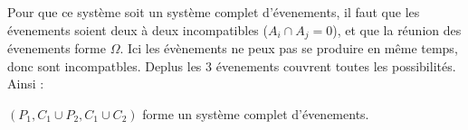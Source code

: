 Pour que ce système soit un système complet d'évenements, il faut que les évenements soient deux à deux incompatibles ($A_i\cap A_j = 0$), et que la réunion des évenements forme $\Omega$.
Ici les évènements ne peux pas se produire en même temps, donc sont incompatbles.
Deplus les  3 évenements couvrent toutes les possibilités.
Ainsi :
\begin{result}
  $(P_1, C_1\cup P_2, C_1\cup C_2)$ forme un système complet d'évenements.
\end{result}
